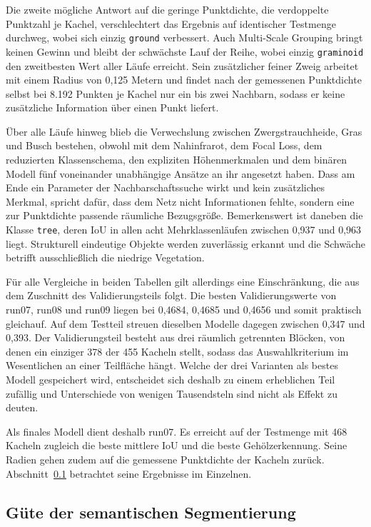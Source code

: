 Die zweite mögliche Antwort auf die geringe Punktdichte, die verdoppelte Punktzahl je Kachel, verschlechtert das Ergebnis auf identischer Testmenge durchweg, wobei sich einzig \texttt{ground} verbessert. Auch Multi-Scale Grouping bringt keinen Gewinn und bleibt der schwächste Lauf der Reihe, wobei einzig \texttt{graminoid} den zweitbesten Wert aller Läufe erreicht. Sein zusätzlicher feiner Zweig arbeitet mit einem Radius von 0,125 Metern und findet nach der gemessenen Punktdichte selbst bei 8.192 Punkten je Kachel nur ein bis zwei Nachbarn, sodass er keine zusätzliche Information über einen Punkt liefert.

Über alle Läufe hinweg blieb die Verwechslung zwischen Zwergstrauchheide, Gras und Busch bestehen, obwohl mit dem Nahinfrarot, dem Focal Loss, dem reduzierten Klassenschema, den expliziten Höhenmerkmalen und dem binären Modell fünf voneinander unabhängige Ansätze an ihr angesetzt haben. Dass am Ende ein Parameter der Nachbarschaftssuche wirkt und kein zusätzliches Merkmal, spricht dafür, dass dem Netz nicht Informationen fehlte, sondern eine zur Punktdichte passende räumliche Bezugsgröße. Bemerkenswert ist daneben die Klasse \texttt{tree}, deren IoU in allen acht Mehrklassenläufen zwischen 0,937 und 0,963 liegt. Strukturell eindeutige Objekte werden zuverlässig erkannt und die Schwäche betrifft ausschließlich die niedrige Vegetation.

Für alle Vergleiche in beiden Tabellen gilt allerdings eine Einschränkung, die aus dem Zuschnitt des Validierungsteils folgt. Die besten Validierungswerte von run07, run08 und run09 liegen bei 0,4684, 0,4685 und 0,4656 und somit praktisch gleichauf. Auf dem Testteil streuen dieselben Modelle dagegen zwischen 0,347 und 0,393. Der Validierungsteil besteht aus drei räumlich getrennten Blöcken, von denen ein einziger 378 der 455 Kacheln stellt, sodass das Auswahlkriterium im Wesentlichen an einer Teilfläche hängt. Welche der drei Varianten als bestes Modell gespeichert wird, entscheidet sich deshalb zu einem erheblichen Teil zufällig und Unterschiede von wenigen Tausendsteln sind nicht als Effekt zu deuten.

Als finales Modell dient deshalb run07. Es erreicht auf der Testmenge mit 468 Kacheln zugleich die beste mittlere IoU und die beste Gehölzerkennung. Seine Radien gehen zudem auf die gemessene Punktdichte der Kacheln zurück. Abschnitt~\ref{evaluation_segmentierung} betrachtet seine Ergebnisse im Einzelnen.

\subsection{Güte der semantischen Segmentierung}\label{evaluation_segmentierung}

